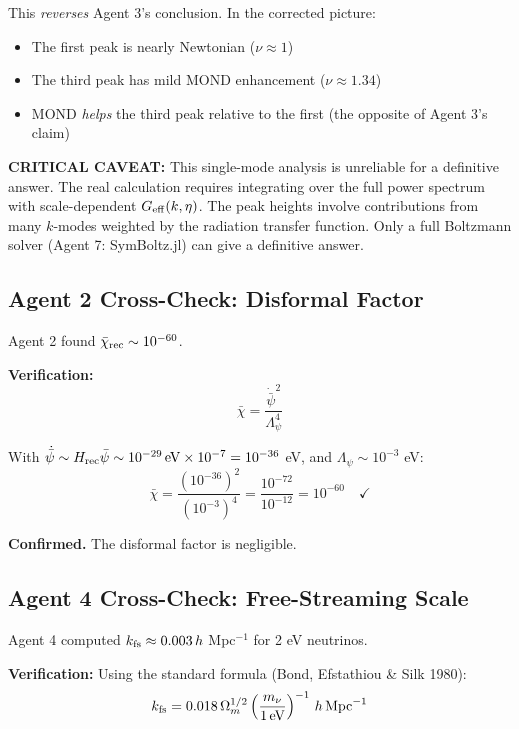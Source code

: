 \documentclass[11pt,a4paper]{article}
\begin{document}
This \emph{reverses} Agent 3's conclusion. In the corrected picture:
\begin{itemize}
\item The first peak is nearly Newtonian ($\nu \approx 1$)
\item The third peak has mild MOND enhancement ($\nu \approx 1.34$)
\item MOND \emph{helps} the third peak relative to the first (the opposite of Agent 3's claim)
\end{itemize}

\textbf{CRITICAL CAVEAT:} This single-mode analysis is unreliable for a definitive answer. The real calculation requires integrating over the full power spectrum with scale-dependent $G_{\rm eff}(k, \eta)$. The peak heights involve contributions from many $k$-modes weighted by the radiation transfer function. Only a full Boltzmann solver (Agent 7: SymBoltz.jl) can give a definitive answer.

\subsection{Agent 2 Cross-Check: Disformal Factor}

Agent 2 found $\bar{\chi}_{\rm rec} \sim 10^{-60}$.

\textbf{Verification:}
\begin{equation}
\bar{\chi} = \frac{\dot{\bar{\psi}}^2}{\Lambda_\psi^4}
\end{equation}

With $\dot{\bar{\psi}} \sim H_{\rm rec}\bar{\psi} \sim 10^{-29}\,\text{eV}\times10^{-7} = 10^{-36}$ eV, and $\Lambda_\psi \sim 10^{-3}$ eV:
\begin{equation}
\bar{\chi} = \frac{(10^{-36})^2}{(10^{-3})^4} = \frac{10^{-72}}{10^{-12}} = 10^{-60} \quad \checkmark
\end{equation}

\textbf{Confirmed.} The disformal factor is negligible.

\subsection{Agent 4 Cross-Check: Free-Streaming Scale}

Agent 4 computed $k_{\rm fs} \approx 0.003\,h$ Mpc$^{-1}$ for 2 eV neutrinos.

\textbf{Verification:} Using the standard formula (Bond, Efstathiou \& Silk 1980):
\begin{equation}
k_{\rm fs} = 0.018\,\Omega_m^{1/2}\left(\frac{m_\nu}{1\,\text{eV}}\right)^{-1}\,h\,\text{Mpc}^{-1}
\end{equation}
\end{document}

